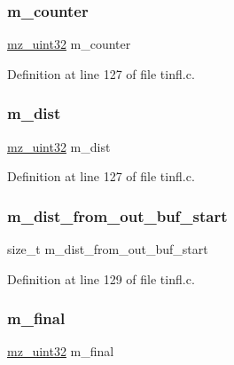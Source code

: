 \subsubsection{\texorpdfstring{m\_counter}{m\_counter}}
{\footnotesize\ttfamily \mbox{\hyperlink{tinfl_8c_ab1a91818a39ac203d5d9f12a003e8557}{mz\+\_\+uint32}} m\+\_\+counter}



Definition at line 127 of file tinfl.\+c.

\mbox{\label{structtinfl__decompressor__tag_aeb88d8d957926c1ef2855d3c5f7cce9b}} 
\subsubsection{\texorpdfstring{m\_dist}{m\_dist}}
{\footnotesize\ttfamily \mbox{\hyperlink{tinfl_8c_ab1a91818a39ac203d5d9f12a003e8557}{mz\+\_\+uint32}} m\+\_\+dist}



Definition at line 127 of file tinfl.\+c.

\mbox{\label{structtinfl__decompressor__tag_a8481db744b76e770f54391d76f704c34}} 
\subsubsection{\texorpdfstring{m\_dist\_from\_out\_buf\_start}{m\_dist\_from\_out\_buf\_start}}
{\footnotesize\ttfamily size\+\_\+t m\+\_\+dist\+\_\+from\+\_\+out\+\_\+buf\+\_\+start}



Definition at line 129 of file tinfl.\+c.

\mbox{\label{structtinfl__decompressor__tag_a815f2b230ad5809549e42f29c39d3308}} 
\subsubsection{\texorpdfstring{m\_final}{m\_final}}
{\footnotesize\ttfamily \mbox{\hyperlink{tinfl_8c_ab1a91818a39ac203d5d9f12a003e8557}{mz\+\_\+uint32}} m\+\_\+final}



